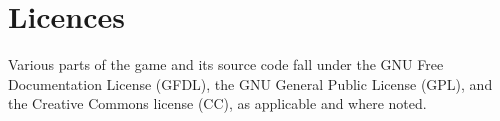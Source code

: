 \section{Licences}

Various parts of the game and its source code fall under the GNU Free Documentation License (GFDL), the GNU General Public License (GPL), and the Creative Commons license (CC), as applicable and where noted.

